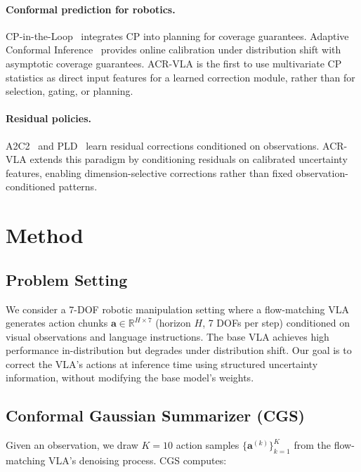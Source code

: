 \documentclass[letterpaper]{article}
\begin{document}
\paragraph{Conformal prediction for robotics.}
CP-in-the-Loop~\cite{cploop} integrates CP into planning for coverage guarantees.
Adaptive Conformal Inference~\cite{aci} provides online calibration under distribution shift with asymptotic coverage guarantees.
ACR-VLA is the first to use multivariate CP statistics as direct input features for a learned correction module, rather than for selection, gating, or planning.

\paragraph{Residual policies.}
A2C2~\cite{a2c2} and PLD~\cite{pld} learn residual corrections conditioned on observations.
ACR-VLA extends this paradigm by conditioning residuals on calibrated uncertainty features, enabling dimension-selective corrections rather than fixed observation-conditioned patterns.

\section{Method}
\label{sec:method}

\subsection{Problem Setting}

We consider a 7-DOF robotic manipulation setting where a flow-matching VLA generates action chunks $\mathbf{a} \in \mathbb{R}^{H \times 7}$ (horizon $H$, 7 DOFs per step) conditioned on visual observations and language instructions.
The base VLA achieves high performance in-distribution but degrades under distribution shift.
Our goal is to correct the VLA's actions at inference time using structured uncertainty information, without modifying the base model's weights.

\subsection{Conformal Gaussian Summarizer (CGS)}
\label{sec:cgs}

Given an observation, we draw $K{=}10$ action samples $\{\mathbf{a}^{(k)}\}_{k=1}^{K}$ from the flow-matching VLA's denoising process.
CGS computes:
\end{document}
